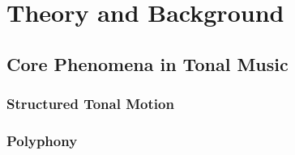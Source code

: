 %
%
%






\setlength{\parindent}{0pt}
\setlength{\parskip}{0pt} %
% 
% 
% 
% 
% 

\cleardoublepage
{}
\tableofcontents

% 


\setlength{\parskip}{1em}


\mainmatter

\cleardoublepage
\part{Theory and Background}
\chapter{Core Phenomena in Tonal Music}
    \section{Structured Tonal Motion}
    \section{Polyphony}
